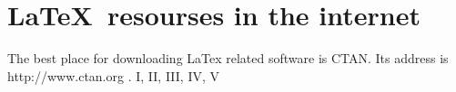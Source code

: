 \documentclass{article}
\begin{document}
\section{\sffamily\LaTeX\ resourses in the internet}
The best place for downloading LaTex related software is CTAN.
Its address is \ttfamily http://www.ctan.org \rmfamily.
\textrm{I, II, III, IV, V}
\end{document}
